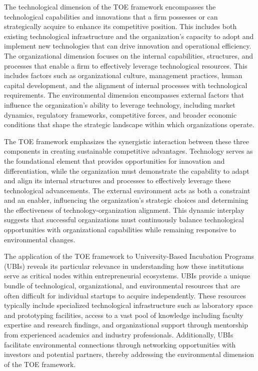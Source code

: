 \documentclass[../Main.tex]{subfiles}
\begin{document}
The technological dimension of the TOE framework encompasses the technological capabilities and innovations that a firm possesses or can strategically acquire to enhance its competitive position. This includes both existing technological infrastructure and the organization's capacity to adopt and implement new technologies that can drive innovation and operational efficiency. The organizational dimension focuses on the internal capabilities, structures, and processes that enable a firm to effectively leverage technological resources. This includes factors such as organizational culture, management practices, human capital development, and the alignment of internal processes with technological requirements. The environmental dimension encompasses external factors that influence the organization's ability to leverage technology, including market dynamics, regulatory frameworks, competitive forces, and broader economic conditions that shape the strategic landscape within which organizations operate.

The TOE framework emphasizes the synergistic interaction between these three components in creating sustainable competitive advantages. Technology serves as the foundational element that provides opportunities for innovation and differentiation, while the organization must demonstrate the capability to adapt and align its internal structures and processes to effectively leverage these technological advancements. The external environment acts as both a constraint and an enabler, influencing the organization's strategic choices and determining the effectiveness of technology-organization alignment. This dynamic interplay suggests that successful organizations must continuously balance technological opportunities with organizational capabilities while remaining responsive to environmental changes.

The application of the TOE framework to University-Based Incubation Programs (UBIs) reveals its particular relevance in understanding how these institutions serve as critical nodes within entrepreneurial ecosystems. UBIs provide a unique bundle of technological, organizational, and environmental resources that are often difficult for individual startups to acquire independently. These resources typically include specialized technological infrastructure such as laboratory space and prototyping facilities, access to a vast pool of knowledge including faculty expertise and research findings, and organizational support through mentorship from experienced academics and industry professionals. Additionally, UBIs facilitate environmental connections through networking opportunities with investors and potential partners, thereby addressing the environmental dimension of the TOE framework.
\end{document}
